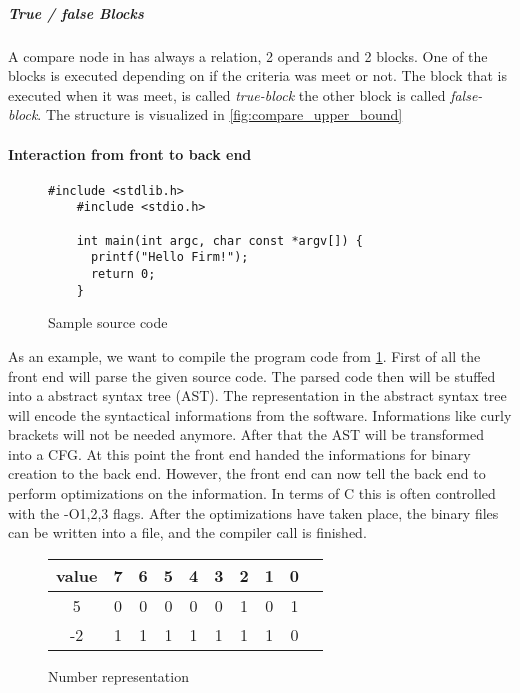 \subparagraph{True / false Blocks}
A compare node in \libFIRM has always a relation, 2 operands and 2 blocks. One of the blocks is executed depending on if the criteria was meet or not. The block that is executed when it was meet, is called \emph{true-block} the other block is called \emph{false-block}. The structure is visualized in \autoref{fig:compare_upper_bound}

\paragraph{Interaction from front to back end}

\begin{figure}
	\centering
	\begin{lstlisting}[frame=single]
	#include <stdlib.h>
	#include <stdio.h>
	
	int main(int argc, char const *argv[]) {
	  printf("Hello Firm!");
	  return 0;
	}
	\end{lstlisting} 
	\caption{Sample source code}
	\label{code:workflow:example}
\end{figure}

As an example, we want to compile the program code from \ref{code:workflow:example}.
First of all the front end will parse the given source code. The parsed code then will be stuffed into a abstract syntax tree (AST). The representation in the abstract syntax tree will encode the syntactical informations from the software. Informations like curly brackets will not be needed anymore. \newline
After that the AST will be transformed into a CFG. \newline
At this point the front end handed the informations for binary creation to the back end. However, the front end can now tell the back end to perform optimizations on the information. In terms of C this is often controlled with the -O{1,2,3} flags. \newline
After the optimizations have taken place, the binary files can be written into a file, and the compiler call is finished.
\begin{figure}
	\centering
	\begin{tabular}{c | c c c c c c c c c}
		value & 7 & 6 & 5 & 4 & 3 & 2 & 1 & 0 \\
		\hline
		5     & 0 & 0 & 0 & 0 & 0 & 1 & 0 & 1 \\
		-2    & 1 & 1 & 1 & 1 & 1 & 1 & 1 & 0 \\
	\end{tabular}
	\caption{Number representation}
	\label{fig:numbers}
\end{figure}
